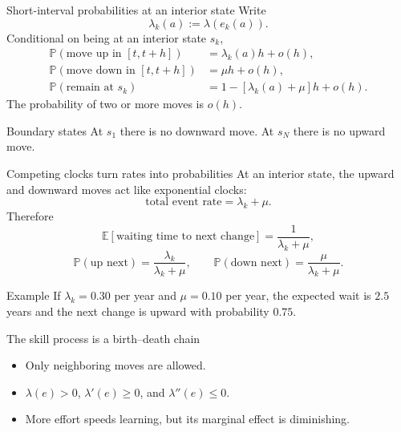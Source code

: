 \documentclass[aspectratio=169,10pt]{beamer}
\newcommand{\E}{\mathbb{E}}
\newcommand{\Pp}{\mathbb{P}}
\begin{document}
\begin{frame}{Short-interval probabilities at an interior state}
Write
\[
\lambda_k(a):=\lambda(e_k(a)).
\]
Conditional on being at an interior state $s_k$,
\begin{align*}
\Pp(\text{move up in }[t,t+h])
&=\lambda_k(a)h+o(h),\\
\Pp(\text{move down in }[t,t+h])
&=\mu h+o(h),\\
\Pp(\text{remain at }s_k)
&=1-[\lambda_k(a)+\mu]h+o(h).
\end{align*}
The probability of two or more moves is $o(h)$.
\begin{block}{Boundary states}
At $s_1$ there is no downward move. At $s_N$ there is no upward move.
\end{block}
\end{frame}

\begin{frame}{Competing clocks turn rates into probabilities}
At an interior state, the upward and downward moves act like exponential clocks:
\[
\text{total event rate}=\lambda_k+\mu.
\]
Therefore
\[
\E[\text{waiting time to next change}]
=\frac{1}{\lambda_k+\mu},
\]
\[
\Pp(\text{up next})
=\frac{\lambda_k}{\lambda_k+\mu},
\qquad
\Pp(\text{down next})
=\frac{\mu}{\lambda_k+\mu}.
\]
\begin{exampleblock}{Example}
If $\lambda_k=0.30$ per year and $\mu=0.10$ per year, the expected wait is $2.5$ years and the next change is upward with probability $0.75$.
\end{exampleblock}
\end{frame}

\begin{frame}{The skill process is a birth--death chain}
\centering
{}
\vspace{5mm}
\begin{itemize}
  \item Only neighboring moves are allowed.
  \item $\lambda(e)>0$, $\lambda'(e)\ge0$, and $\lambda''(e)\le0$.
  \item More effort speeds learning, but its marginal effect is diminishing.
\end{itemize}
\end{frame}
\end{document}
